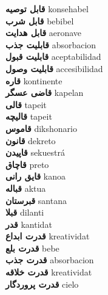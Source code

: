 \textbf{ قابل توصیه  } konsehabel \\
\textbf{ قابل شرب  } bebibel \\
\textbf{ قابل هدایت  } aeronave \\
\textbf{ قابلیت جذب  } absorbacion \\
\textbf{ قابلیت قبول  } aceptabilidad \\
\textbf{ قابلیت وصول  } accesibilidad \\
\textbf{ قاره  } kontinente \\
\textbf{ قاضی عسگر  } kapelan \\
\textbf{ قالی  } tapeit \\
\textbf{ قالیچه  } tapeit \\
\textbf{ قاموس  } dikshonario \\
\textbf{ قانون  } dekreto \\
\textbf{ قاپیدن  } sekuestrá \\
\textbf{ قاچاق  } preto \\
\textbf{ قایق رانی  } kanoa \\
\textbf{ قباله  } aktua \\
\textbf{ قبرستان  } santana \\
\textbf{ قبلا  } dilanti \\
\textbf{ قدر  } kantidat \\
\textbf{ قدرت ابداع  } kreatividat \\
\textbf{ قدرت بلع  } bebe \\
\textbf{ قدرت جذب  } absorbacion \\
\textbf{ قدرت خلاقه  } kreatividat \\
\textbf{ قدرت پروردگار  } cielo \\
